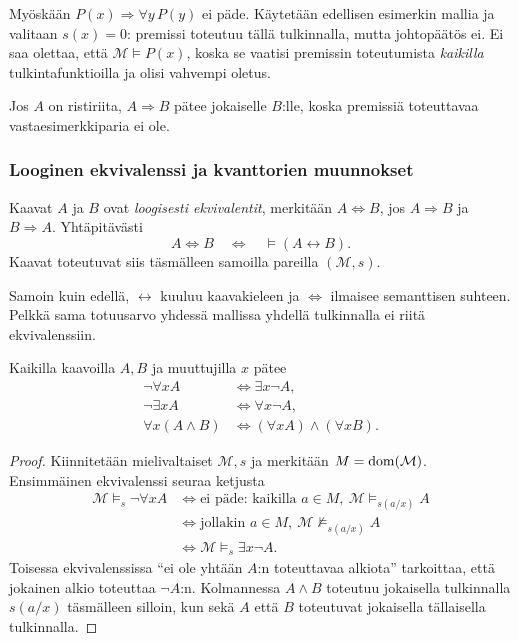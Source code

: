 \documentclass[11pt,a4paper]{amsart}
\begin{document}
\begin{remark}
  Myöskään $P(x)\Rightarrow\forall y\,P(y)$ ei päde. Käytetään
  edellisen esimerkin mallia ja valitaan $s(x)=0$: premissi toteutuu
  tällä tulkinnalla, mutta johtopäätös ei. Ei saa olettaa, että
  $\mathcal M\models P(x)$, koska se vaatisi premissin toteutumista
  \emph{kaikilla} tulkintafunktioilla ja olisi vahvempi oletus.
\end{remark}

Jos $A$ on ristiriita, $A\Rightarrow B$ pätee jokaiselle $B$:lle,
koska premissiä toteuttavaa vastaesimerkkiparia ei ole.

\clearpage
\subsubsection{Looginen ekvivalenssi ja kvanttorien muunnokset}

\begin{definition}
  Kaavat $A$ ja $B$ ovat \emph{loogisesti ekvivalentit}, merkitään
  $A\Leftrightarrow B$, jos $A\Rightarrow B$ ja $B\Rightarrow A$.
  Yhtäpitävästi
  \[
    A\Leftrightarrow B
    \quad\Longleftrightarrow\quad
    \models(A\leftrightarrow B).
  \]
  Kaavat toteutuvat siis täsmälleen samoilla pareilla $(\mathcal M,s)$.
\end{definition}

Samoin kuin edellä, $\leftrightarrow$ kuuluu kaavakieleen ja
$\Leftrightarrow$ ilmaisee semanttisen suhteen. Pelkkä sama totuusarvo
yhdessä mallissa yhdellä tulkinnalla ei riitä ekvivalenssiin.

\begin{proposition}
  Kaikilla kaavoilla $A,B$ ja muuttujilla $x$ pätee
  \begin{align*}
    \neg\forall x A &\Leftrightarrow\exists x\neg A,\\
    \neg\exists x A &\Leftrightarrow\forall x\neg A,\\
    \forall x(A\land B) &\Leftrightarrow
    (\forall x A)\land(\forall x B).
  \end{align*}
\end{proposition}

\begin{proof}
  Kiinnitetään mielivaltaiset $\mathcal M,s$ ja merkitään
  $M=\operatorname{dom}(\mathcal M)$. Ensimmäinen ekvivalenssi seuraa ketjusta
  \begin{align*}
    \mathcal M\models_s\neg\forall x A
    &\iff \text{ei päde: kaikilla }a\in M,
    \ \mathcal M\models_{s(a/x)}A\\
    &\iff \text{jollakin }a\in M,
    \ \mathcal M\not\models_{s(a/x)}A\\
    &\iff \mathcal M\models_s\exists x\neg A.
  \end{align*}
  Toisessa ekvivalenssissa ``ei ole yhtään $A$:n toteuttavaa alkiota''
  tarkoittaa, että jokainen alkio toteuttaa $\neg A$:n.
  Kolmannessa $A\land B$ toteutuu jokaisella tulkinnalla $s(a/x)$
  täsmälleen silloin, kun sekä $A$ että $B$ toteutuvat jokaisella
  tällaisella tulkinnalla.
\end{proof}
\end{document}
